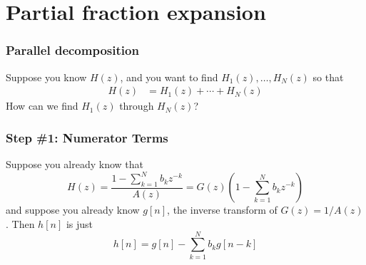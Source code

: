 \documentclass{beamer}
\begin{document}
%
%


\section[PFE]{Partial fraction expansion}

\begin{frame}
  \frametitle{Parallel decomposition}

  Suppose you know $H(z)$, and you want to find $H_1(z),\ldots,H_N(z)$ so that
  \begin{align*}
    H(z) &= H_1(z)+\cdots + H_N(z)
  \end{align*}
  How can we find $H_1(z)$ through $H_N(z)$?
\end{frame}
      
\begin{frame}
  \frametitle{Step \#1: Numerator Terms}

  Suppose you already know that
  \begin{displaymath}
    H(z) = \frac{1-\sum_{k=1}^N b_kz^{-k}}{A(z)} = G(z)\left(1-\sum_{k=1}^N b_kz^{-k}\right)
  \end{displaymath}
  and suppose you already know $g[n]$, the inverse transform of $G(z)=1/A(z)$.  Then
  $h[n]$ is just
  \begin{displaymath}
    h[n] = g[n] -\sum_{k=1}^N b_k g[n-k]
  \end{displaymath}
\end{frame}
\end{document}
